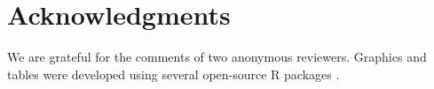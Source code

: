 \documentclass[3p, authoryear, review]{elsarticle} %
\begin{document}
\hypertarget{acknowledgments}{%
\section*{Acknowledgments}\label{acknowledgments}}

We are grateful for the comments of two anonymous reviewers. Graphics and tables
were developed using several open-source R packages \citep{ggspatial, modelsummary, wesanderson}.


\end{document}
